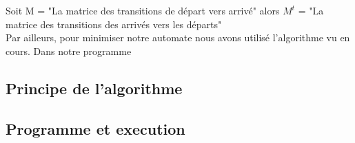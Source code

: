 \documentclass[a4paper]{article}
\begin{document}
Soit M = "La matrice des transitions de départ vers arrivé"
alors $M^t$ = "La matrice des transitions des arrivés vers les départs"\\

Par ailleurs, pour minimiser notre automate nous avons utilisé l'algorithme vu
en cours. Dans notre programme 


\subsection{Principe de l'algorithme}



\subsection{Programme et execution}
\end{document}
